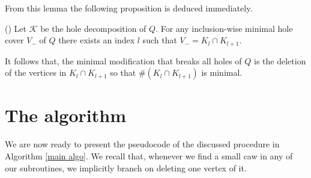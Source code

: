 \documentclass{article}
\begin{document}
    From this lemma the following proposition 
    is deduced immediately.

    \begin{prop} (\cite{main}) \label{cycle prop}
        Let $\mathcal{K}$ be the hole decomposition of
        $Q$. For any
        inclusion-wise 
        minimal hole cover $V_{-}$ of $Q$
        there exists an index $l$ 
        such that $V_{-} = K_{l} \cap K_{l+1}$.
    \end{prop}

    It follows that,
    the minimal modification
    that breaks all holes of $Q$ 
    is the deletion of the
    vertices in $K_{l} \cap K_{l+1}$ 
    so that $\# \left(K_{l} \cap K_{l+1}\right)$
    is minimal.

    \section{The algorithm}
    
    We are now ready to
    present the pseudocode
    of the discussed procedure in
    Algorithm \ref{main algo}.
    We recall that, whenever
    we find a small caw in
    any of our subroutines,
    we implicitly branch
    on deleting one vertex of it.
\end{document}
